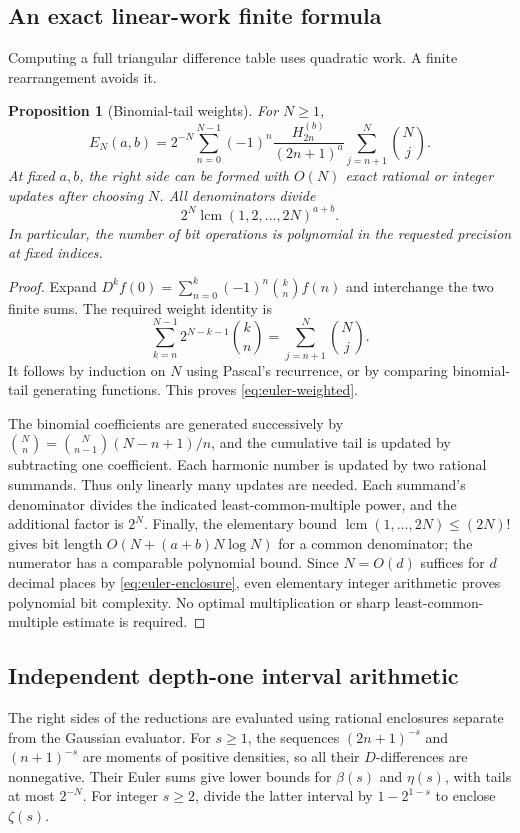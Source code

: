 \documentclass[11pt,a4paper]{article}
\numberwithin{equation}{section}
\newtheorem{proposition}[theorem]{Proposition}
\theoremstyle{definition}
\theoremstyle{remark}
\begin{document}
\subsection{An exact linear-work finite formula}
Computing a full triangular difference table uses quadratic work. A finite rearrangement avoids it.

\begin{proposition}[Binomial-tail weights]\label{prop:euler-weights}
For $N\ge1$,
\begin{equation}\label{eq:euler-weighted}
 E_N(a,b)=2^{-N}\sum_{n=0}^{N-1}(-1)^n
 \frac{H_{2n}^{(b)}}{(2n+1)^a}\sum_{j=n+1}^{N}\binom Nj.
\end{equation}
At fixed $a,b$, the right side can be formed with $O(N)$ exact rational or integer updates after choosing $N$. All denominators divide
\begin{equation}\label{eq:denominator-bound}
 2^N\operatorname{lcm}(1,2,\ldots,2N)^{a+b}.
\end{equation}
In particular, the number of bit operations is polynomial in the requested precision at fixed indices.
\end{proposition}
\begin{proof}
Expand $D^kf(0)=\sum_{n=0}^k(-1)^n\binom kn f(n)$ and interchange the two finite sums. The required weight identity is
\[
 \sum_{k=n}^{N-1}2^{N-k-1}\binom kn
 =\sum_{j=n+1}^N\binom Nj.
\]
It follows by induction on $N$ using Pascal's recurrence, or by comparing binomial-tail generating functions. This proves \eqref{eq:euler-weighted}.

The binomial coefficients are generated successively by
$\binom Nn=\binom N{n-1}(N-n+1)/n$, and the cumulative tail is updated by subtracting one coefficient. Each harmonic number is updated by two rational summands. Thus only linearly many updates are needed. Each summand's denominator divides the indicated least-common-multiple power, and the additional factor is $2^N$.
Finally, the elementary bound $\operatorname{lcm}(1,\ldots,2N)\le(2N)!$ gives bit length $O(N+(a+b)N\log N)$ for a common denominator; the numerator has a comparable polynomial bound. Since $N=O(d)$ suffices for $d$ decimal places by \eqref{eq:euler-enclosure}, even elementary integer arithmetic proves polynomial bit complexity. No optimal multiplication or sharp least-common-multiple estimate is required.
\end{proof}

\subsection{Independent depth-one interval arithmetic}
The right sides of the reductions are evaluated using rational enclosures separate from the Gaussian evaluator. For $s\ge1$, the sequences $(2n+1)^{-s}$ and $(n+1)^{-s}$ are moments of positive densities, so all their $D$-differences are nonnegative. Their Euler sums give lower bounds for $\beta(s)$ and $\eta(s)$, with tails at most $2^{-N}$. For integer $s\ge2$, divide the latter interval by $1-2^{1-s}$ to enclose $\zeta(s)$.
\end{document}
